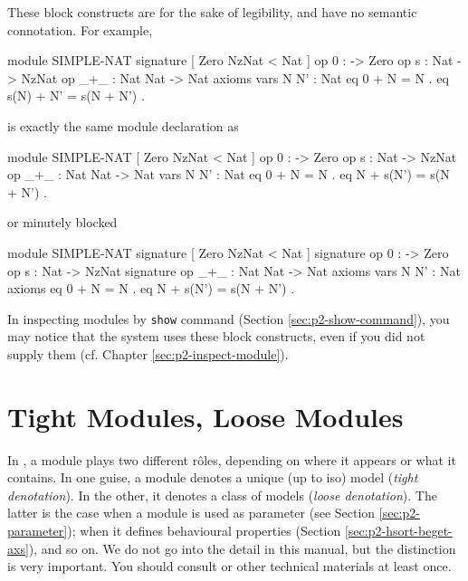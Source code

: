 \documentclass[a4paper]{memoir}
\begin{document}
These block constructs are for the sake of
legibility, and have no semantic connotation. For example,
\label{exs:simple-nat}
\begin{vvtm}
\begin{ccode}
  module SIMPLE-NAT {
    signature {
      [ Zero NzNat < Nat ]
      op 0  : -> Zero
      op s : Nat -> NzNat 
      op _+_ : Nat Nat -> Nat
    }
    axioms {
      vars N N' : Nat
      eq 0 + N = N .
      eq s(N) + N' = s(N + N') .
    }  
  }
\end{ccode}
\end{vvtm}
is exactly the same module declaration as
\begin{vvtm}
\begin{ccode}
  module SIMPLE-NAT {
    [ Zero NzNat < Nat ]
    op 0  : -> Zero
    op s : Nat -> NzNat 
    op _+_ : Nat Nat -> Nat
    vars N N' : Nat
    eq 0 + N = N .
    eq N + s(N') = s(N + N') .
  }
\end{ccode}
\end{vvtm}
or minutely blocked
\begin{vvtm}
\begin{ccode}
    module SIMPLE-NAT {
    signature {
      [ Zero NzNat < Nat ]
    }
    signature {
      op 0  : -> Zero
      op s : Nat -> NzNat 
    }
    signature {
      op _+_ : Nat Nat -> Nat
    }  
    axioms {
      vars N N' : Nat
    }
    axioms {
      eq 0 + N = N .
      eq N + s(N') = s(N + N') .
    }
  }
\end{ccode}
\end{vvtm}
\begin{warning}
In inspecting modules by \verb|show| command
(Section \ref{sec:p2-show-command}),
you may notice that the system uses these block constructs,
even if you did not supply them (cf. Chapter \ref{sec:p2-inspect-module}).
\end{warning}

\section{Tight Modules, Loose Modules}\label{sec:p2-obj-th}

In \cafeobj, a module plays two different r{\^ o}les, depending on where it
appears or what it contains. In one guise, a module denotes a unique
(up to iso) model ({\em tight denotation}).
In the other, it denotes a class of models ({\em loose denotation}).
 The latter is the case when
a module is used as parameter (see Section \ref{sec:p2-parameter});
when it defines behavioural properties (Section \ref{sec:p2-hsort-beget-axs}),
and so on. We do not go into the detail in this manual, but the distinction
is very important. You should consult \cite{cafeobj-rep} or other
technical materials at least once.
\end{document}
